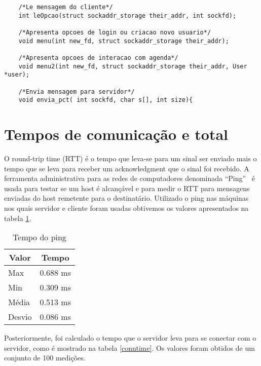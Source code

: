 \documentclass[10pt,a4paper]{article}
\begin{document}
\begin{itemize}
\begin{lstlisting}
    /*Le mensagem do cliente*/
    int leOpcao(struct sockaddr_storage their_addr, int sockfd);
    
    /*Apresenta opcoes de login ou criacao novo usuario*/
    void menu(int new_fd, struct sockaddr_storage their_addr);
    
    /*Apresenta opcoes de interacao com agenda*/
    void menu2(int new_fd, struct sockaddr_storage their_addr, User *user);

    /*Envia mensagem para servidor*/
    void envia_pct( int sockfd, char s[], int size){

    \end{lstlisting}


  \end{itemize}




  \section{Tempos de comunicação e total}
  O round-trip time (RTT) é o tempo que leva-se para um sinal ser
  enviado mais o tempo que se leva para receber um acknowledgment que o
  sinal foi recebido. A ferramenta administrativa para as redes de
  computadores denominada ``Ping''~\cite{Ping} é usada para testar se um host é alcançável e para
  medir o RTT para mensagens enviadas do host remetente para o
  destinatário.
  Utilizado o ping nas máquinas nos quais servidor e cliente foram
  usadas obtivemos os valores apresentados na tabela \ref{pingtime}.

  \begin{table}[h!]
    \begin{center}
        \begin{tabular}{lr}
          \multicolumn{1}{c}{Valor} & \multicolumn{1}{c}{Tempo}\\
          \hline
          Max & 0.688 ms\\
          Min & 0.309 ms\\
          Média & 0.513 ms \\
          Desvio & 0.086 ms
        \end{tabular}
    \end{center}
    \vspace{-5mm}
    \caption{Tempo do ping}        \label{pingtime}
  \end{table}

  Posteriormente,  foi calculado o tempo que o servidor leva para se
  conectar com o servidor, como é mostrado na tabela \ref{conntime}. Os valores foram obtidos de um
  conjunto de 100 medições.
\end{document}
